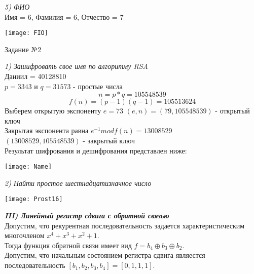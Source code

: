 \emph {5) ФИО}\\
Имя = 6, Фамилия = 6, Отчество = 7\\

\begin{center}
  \texttt{[image: FIO]}
\end{center}

\begin{title}
  Задание №2
\end{title}

\emph {1) Зашифровать свое имя по алгоритму RSA}\\
Даниил = 40128810\\

$p = 3343$ и $q = 31573$ - простые числа\\
\[n = p*q = 105548539\]
\[f(n) = (p - 1)(q - 1) = 105513624\]
Выберем открытую экспоненту $e = 73$
$(e, n) = (79 , 105548539)$ - открытый ключ\\
Закрытая экспонента равна $e^{-1} mod f(n) = 13008529$\\
$(13008529, 105548539)$ - закрытый ключ\\
Результат шифрования и дешифрования представлен ниже:\\

\begin{center}
  \texttt{[image: Name]}
\end{center}

\emph {2) Найти простое шестнадцатизначное число}\\

\begin{center}
  \texttt{[image: Prost16]}
\end{center}

{\bf \emph {III) Линейный регистр сдвига с обратной связью}}\\
Допустим, что рекурентная последовательность задается характеристическим
многочленом
$x^4 + x^3 + x^2 + 1$.\\
Тогда функция обратной связи имеет вид $f = b_4 \oplus b_3 \oplus b_2$.\\
Допустим, что начальным состоянием регистра сдвига являестся последовательность
$[b_1, b_2, b_3, b_4] = [0, 1, 1, 1]$.\\

